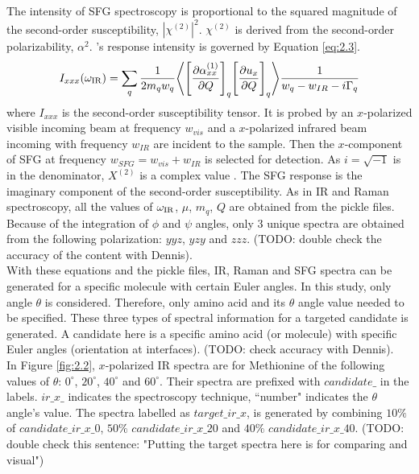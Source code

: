 The intensity of SFG spectroscopy is proportional to the squared magnitude of the second-order susceptibility, $\left|  \chi^{(2)}\right|^{2}$. $\chi^{(2)}$ is derived from the second-order polarizability, $\alpha^{2}$.
's response intensity is governed by Equation \ref{eq:2.3}. \\
\begin{equation} \label{eq:2.3}
I_{xxx}(\omega_{\rm IR}) = \sum_{q} \frac{1}{2 m_{q} w_{q}} \Bigg \langle \Bigg\lbrack \frac{\partial \alpha_{xx}^{(1)}}{\partial Q} \Bigg\rbrack_{q} \Bigg\lbrack \frac{\partial u_{x}}{\partial Q} \Bigg\rbrack_{q} \Bigg\rangle \frac{1}{w_{q}-w_{IR}-i\Gamma_q}
\end{equation} 
where $I_{xxx}$ is the second-order susceptibility tensor. It is probed by an $x$-polarized visible incoming beam at frequency $w_{vis}$ and a $x$-polarized infrared beam incoming with frequency $w_{IR}$ are incident to the sample. Then the $x$-component of SFG at frequency $w_{SFG}=w_{vis}+w_{IR}$ is selected for detection. As $i=\sqrt{-1}$ is in the denominator, $X^{(2)}$ is a complex value \cite{KuoKaiHung:Thesis:2015}. The SFG response is the imaginary component of the second-order susceptibility. As in IR and Raman spectroscopy, all the values of $\omega_{\rm IR}$, $\mu$, $m_q$, $Q$ are obtained from the pickle files. Because of the integration of $\phi$ and $\psi$ angles, only 3 unique spectra are obtained from the following polarization: $yyz$, $yzy$ and $zzz$. (TODO: double check the accuracy of the content with Dennis). \\

With these equations and the pickle files, IR, Raman and SFG spectra can be generated for a specific molecule with certain Euler angles. In this study, only angle $\theta$ is considered. Therefore, only amino acid and its $\theta$ angle value needed to be specified. These three types of spectral information for a targeted candidate is generated. A candidate here is a specific amino acid (or molecule) with specific Euler angles (orientation at interfaces). (TODO: check accuracy with Dennis). \\

In Figure \ref{fig:2.2}, $x$-polarized IR spectra are for Methionine of the following values of $\theta$: $0^{\circ}$, $20^{\circ}$, $40^{\circ}$ and $60^{\circ}$. Their spectra are prefixed with $candidate\_$ in the labels. $ir\_x\_$ indicates the spectroscopy technique, ``number" indicates the $\theta$ angle's value. The spectra labelled as $target\_ir\_x$, is generated by combining $10\%$ of $candidate\_ir\_x\_0$, $50\%$ $candidate\_ir\_x\_20$ and $40\%$ $candidate\_ir\_x\_40$. (TODO: double check this sentence: "Putting the target spectra here is for comparing and visual")  \\

